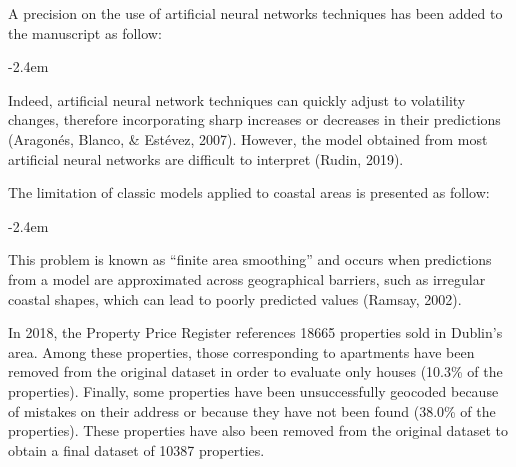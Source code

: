 \documentclass[]{article}
\renewenvironment{quote}{\begin{fquote}\advance\leftmargini -2.4em\begin{oldquote}}{\end{oldquote}\end{fquote}}
\newenvironment{fquote}
  {\def\FrameCommand{
	\fboxsep=0.6em %
	\fcolorbox{black}{white}}%
    \MakeFramed {\advance\hsize-2\width \FrameRestore}
    \begin{minipage}{\linewidth}
  }
  {\end{minipage}\endMakeFramed}
\begin{document}

A precision on the use of artificial neural networks techniques has been added to the manuscript as follow:

\begin{quote}
Indeed, artificial neural network techniques can quickly adjust to volatility changes, therefore incorporating sharp increases or decreases in their predictions (Aragonés, Blanco, \& Estévez, 2007). However, the model obtained from most artificial neural networks are difficult to interpret (Rudin, 2019).
\end{quote}

The limitation of classic models applied to coastal areas is presented as follow:

\begin{quote}
This problem is known as ``finite area smoothing'' and occurs when predictions from a model are approximated across geographical barriers, such as irregular coastal shapes, which can lead to poorly predicted values (Ramsay, 2002).
\end{quote}


In 2018, the Property Price Register references 18665 properties sold in Dublin's area. Among these properties, those corresponding to apartments have been removed from the original dataset in order to evaluate only houses (10.3\% of the properties). Finally, some properties have been unsuccessfully geocoded because of mistakes on their address or because they have not been found (38.0\% of the properties). These properties have also been removed from the original dataset to obtain a final dataset of 10387 properties.
\end{document}
